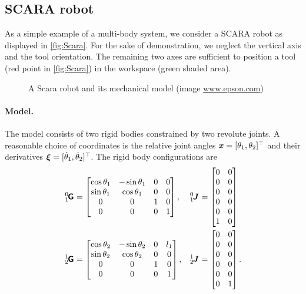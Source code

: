 \subsection{SCARA robot}\label{sec:CtrlScara}
As a simple example of a multi-body system, we consider a SCARA robot as displayed in \autoref{fig:Scara}.
For the sake of demonstration, we neglect the vertical axis and the tool orientation.
The remaining two axes are sufficient to position a tool (red point in \autoref{fig:Scara}) in the workspace (green shaded area).

\begin{figure}[ht]
 \centering
 
 \caption{A Scara robot and its mechanical model (image \url{www.epson.com})}
 \label{fig:Scara}
\end{figure}

\paragraph{Model.}
The model consists of two rigid bodies constrained by two revolute joints.
A reasonable choice of coordinates is the relative joint angles $\sysCoord = [\jointAngle[1], \jointAngle[2]]^\top$ and their derivatives $\sysVel = [\jointAngled[1], \jointAngled[2]]^\top$.
The rigid body configurations are
\begin{subequations}
\begin{align}
 \bodyHomoCoord{0}{1} &=
 \begin{bmatrix}
  \cos\jointAngle[1] & -\sin\jointAngle[1] & 0 & 0 \\
  \sin\jointAngle[1] &  \cos\jointAngle[1] & 0 & 0 \\
  0 & 0 & 1 & 0 \\
  0 & 0 & 0 & 1
 \end{bmatrix},&
 \bodyJac{0}{1} &= \begin{bmatrix} 0 & 0 \\ 0 & 0 \\ 0 & 0 \\ 0 & 0 \\ 0 & 0 \\ 1 & 0 \end{bmatrix}
\\
 \bodyHomoCoord{1}{2} &=
 \begin{bmatrix}
  \cos\jointAngle[2] & -\sin\jointAngle[2] & 0 & l_1 \\
  \sin\jointAngle[2] &  \cos\jointAngle[2] & 0 & 0 \\
  0 & 0 & 1 & 0 \\
  0 & 0 & 0 & 1
 \end{bmatrix},&
 \bodyJac{1}{2} &= \begin{bmatrix} 0 & 0 \\ 0 & 0 \\ 0 & 0 \\ 0 & 0 \\ 0 & 0 \\ 0 & 1 \end{bmatrix}
 .
\end{align} 
\end{subequations}

